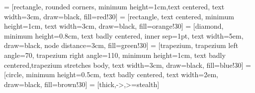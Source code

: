  = [rectangle, rounded corners, minimum height=1cm,text centered, text width=3cm, draw=black, fill=red!30]
 = [rectangle, text centered, minimum height=1cm, text width=3cm, draw=black, fill=orange!30]
 = [diamond, minimum height=0.8cm, text badly centered, inner sep=1pt, text width=5em, draw=black, node distance=3cm, fill=green!30]
 = [trapezium, trapezium left angle=70, trapezium right angle=110, minimum height=1cm, text badly centered,trapezium stretches body, text width=3cm, draw=black, fill=blue!30]
 = [circle, minimum height=0.5cm, text badly centered, text width=2em, draw=black, fill=brown!30]
 = [thick,->,>=stealth]
